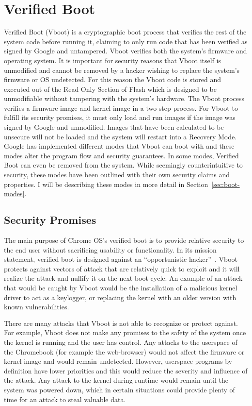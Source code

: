 \documentclass[../report.tex]{subfiles}
\begin{document}
\onehalfspacing

\newpage
\section{Verified Boot}

Verified Boot (Vboot) is a cryptographic boot process that verifies the rest of the system code before running it, claiming to only run code that has been verified as signed by Google and untampered.
Vboot verifies both the system's firmware and operating system.
It is important for security reasons that Vboot itself is unmodified and cannot be removed by a hacker wishing to replace the system's firmware or OS undetected.
For this reason the Vboot code is stored and executed out of the Read Only Section of Flash which is designed to be unmodifiable without tampering with the system's hardware.
The Vboot process verifies a firmware image and kernel image in a two step process.
For Vboot to fulfill its security promises, it must only load and run images if the image was signed by Google and unmodified.
Images that have been calculated to be unsecure will not be loaded and the system will restart into a Recovery Mode.
Google has implemented different modes that Vboot can boot with and these modes alter the program flow and security guarantees.
In some modes, Verified Boot can even be removed from the system.
While seemingly counterintuitive to security, these modes have been outlined with their own security claims and properties.
I will be describing these modes in more detail in Section~\ref{sec:boot-modes}.


\subsection{Security Promises}

The main purpose of Chrome OS's verified boot is to provide relative security to the end user without sacrificing usability or functionality. 
In its mission statement, verified boot is designed against an ``opportunistic hacker''~\cite{vboot-design-doc}.
Vboot protects against vectors of attack that are relatively quick to exploit and it will realize the attack and nullify it on the next boot cycle.
An example of an attack that would be caught by Vboot would be the installation of a malicious kernel driver to act as a keylogger, or replacing the kernel with an older version with known vulnerabilities.

There are many attacks that Vboot is not able to recognize or protect against.
For example, Vboot does not make any promises to the safety of the system once the kernel is running and the user has control. 
Any attacks to the userspace of the Chromebook (for example the web-browser) would not affect the firmware or kernel image and would remain undetected.
However, userspace programs by definition have lower priorities and this would reduce the severity and influence of the attack.
Any attack to the kernel during runtime would remain until the system was powered down, which in certain situations could provide plenty of time for an attack to steal valuable data.
\end{document}
